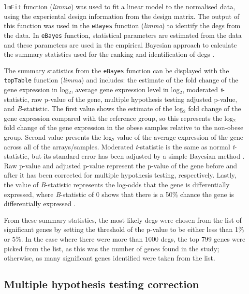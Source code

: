 \texttt{lmFit} function (\textit{limma}) was used to fit a linear model to the normalised data, using the experiental design information from the design matrix.
The output of this function was used in the \texttt{eBayes} function (\textit{limma}) to identify the \glspl{deg} from the data.
In \texttt{eBayes} function, statistical parameters are estimated from the data and these parameters are used in the empirical Bayesian approach to calculate the summary statistics used for the ranking and identification of \glspl{deg} \citep{Smyth2004}.

The summary statistics from the \texttt{eBayes} function can be displayed with the \texttt{topTable} function (\textit{limma}) and includes: the estimate of the fold change of the gene expression in log$_2$, average gene expression level in log$_2$, moderated \textit{t}-statistic, raw p-value of the gene, multiple hypothesis testing adjusted p-value, and \textit{B}-statistic.
The first value shows the estimate of the log$_2$ fold change of the gene expression compared with the reference group, so this represents the log$_2$ fold change of the gene expression in the obese samples relative to the non-obese group.
Second value presents the log$_2$ value of the average expression of the gene across all of the arrays/samples.
Moderated \textit{t}-statistic is the same as normal \textit{t}-statistic, but its standard error has been adjusted by a simple Bayesian method \citep{Smyth2005}.
Raw p-value and adjusted p-value represent the p-value of the gene before and after it has been corrected for multiple hypothesis testing, respectively.
Lastly, the value of \textit{B}-statistic represents the log-odds that the gene is differentially expressed, where \textit{B}-statistic of 0 shows that there is a 50\% chance the gene is differentially expressed \citep{Smyth2005}.

From these summary statistics, the most likely \glspl{deg} were chosen from the list of significant genes by setting the threshold of the p-value to be either less than 1\% or 5\%.
In the case where there were more than 1000 \glspl{deg}, the top 799 genes were picked from the list, as this was the number of genes found in the \citet{Creighton2012} study; otherwise, as many significant genes identified were taken from the list.

\subsection{Multiple hypothesis testing correction}
\label{sub:multiple_hypothesis_testing_correction}

